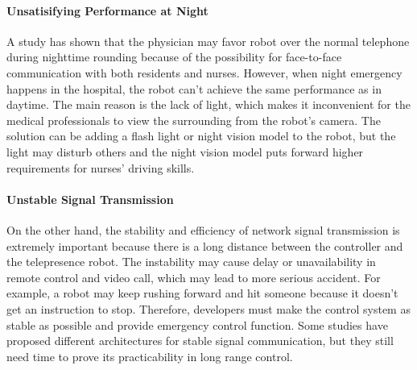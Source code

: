 \documentclass[a4paper]{article}
\begin{document}
\paragraph{Unsatisifying Performance at Night}
    A study has shown that the physician may favor robot over the normal telephone during nighttime rounding because of the possibility for face-to-face communication with both residents and nurses\cite{28}. However, when  night emergency happens in the hospital, the robot can't achieve the same performance as in daytime. The main reason is the lack of light, which makes it inconvenient for the medical professionals to view the surrounding from the robot's camera. The solution can be adding a flash light or night vision model to the robot, but the light may disturb others and the night vision model puts forward higher requirements for nurses' driving skills.

\paragraph{Unstable Signal Transmission}
    On the other hand, the stability and efficiency of network signal transmission is extremely important because there is a long distance between the controller and the telepresence robot. The instability may cause delay or unavailability in remote control and video call, which may lead to more serious accident. For example, a robot may keep rushing forward and hit someone because it doesn't get an instruction to stop. Therefore, developers must make the control system as stable as possible and provide emergency control function. Some studies have proposed different architectures for stable signal communication, but they still need time to prove its practicability in long range control.
\end{document}
